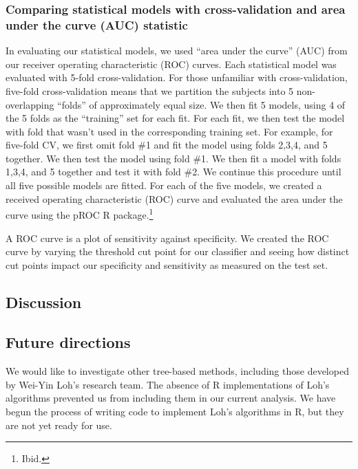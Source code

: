 \documentclass[11pt,]{article}
\let\rmarkdownfootnote\footnote%
\def\footnote{\protect\rmarkdownfootnote}
\begin{document}

\subsubsection{Comparing statistical models with cross-validation and
area under the curve (AUC)
statistic}\label{comparing-statistical-models-with-cross-validation-and-area-under-the-curve-auc-statistic}

In evaluating our statistical models, we used ``area under the curve''
(AUC) from our receiver operating characteristic (ROC) curves. Each
statistical model was evaluated with 5-fold cross-validation. For those
unfamiliar with cross-validation, five-fold cross-validation means that
we partition the subjects into 5 non-overlapping ``folds'' of
approximately equal size. We then fit 5 models, using 4 of the 5 folds
as the ``training'' set for each fit. For each fit, we then test the
model with fold that wasn't used in the corresponding training set. For
example, for five-fold CV, we first omit fold \#1 and fit the model
using folds 2,3,4, and 5 together. We then test the model using fold
\#1. We then fit a model with folds 1,3,4, and 5 together and test it
with fold \#2. We continue this procedure until all five possible models
are fitted. For each of the five models, we created a received operating
characteristic (ROC) curve and evaluated the area under the curve using
the pROC R package.\footnote{Ibid. }

A ROC curve is a plot of sensitivity against specificity. We created the
ROC curve by varying the threshold cut point for our classifier and
seeing how distinct cut points impact our specificity and sensitivity as
measured on the test set.

\subsection{Discussion}\label{discussion}

\subsection{Future directions}\label{future-directions}

We would like to investigate other tree-based methods, including those
developed by Wei-Yin Loh's research team. The absence of R
implementations of Loh's algorithms prevented us from including them in
our current analysis. We have begun the process of writing code to
implement Loh's algorithms in R, but they are not yet ready for use.
\end{document}
